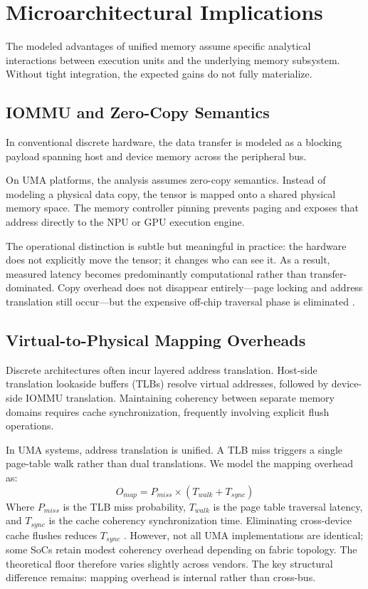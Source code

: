 \documentclass[conference]{IEEEtran}
\begin{document}
\section{Microarchitectural Implications}

The modeled advantages of unified memory assume specific analytical interactions between execution units and the underlying memory subsystem. Without tight integration, the expected gains do not fully materialize.

\subsection{IOMMU and Zero-Copy Semantics}
In conventional discrete hardware, the data transfer is modeled as a blocking payload spanning host and device memory across the peripheral bus.

On UMA platforms, the analysis assumes zero-copy semantics. Instead of modeling a physical data copy, the tensor is mapped onto a shared physical memory space. The memory controller pinning prevents paging and exposes that address directly to the NPU or GPU execution engine. 

The operational distinction is subtle but meaningful in practice: the hardware does not explicitly move the tensor; it changes who can see it. As a result, measured latency becomes predominantly computational rather than transfer-dominated. Copy overhead does not disappear entirely—page locking and address translation still occur—but the expensive off-chip traversal phase is eliminated \cite{b24}.

\subsection{Virtual-to-Physical Mapping Overheads}
Discrete architectures often incur layered address translation. Host-side translation lookaside buffers (TLBs) resolve virtual addresses, followed by device-side IOMMU translation. Maintaining coherency between separate memory domains requires cache synchronization, frequently involving explicit flush operations.

In UMA systems, address translation is unified. A TLB miss triggers a single page-table walk rather than dual translations. We model the mapping overhead as:
\begin{equation}
O_{map} = P_{miss} \times (T_{walk} + T_{sync})
\end{equation}
Where $P_{miss}$ is the TLB miss probability, $T_{walk}$ is the page table traversal latency, and $T_{sync}$ is the cache coherency synchronization time. Eliminating cross-device cache flushes reduces $T_{sync}$ \cite{b19}. However, not all UMA implementations are identical; some SoCs retain modest coherency overhead depending on fabric topology. The theoretical floor therefore varies slightly across vendors. The key structural difference remains: mapping overhead is internal rather than cross-bus.
\end{document}
